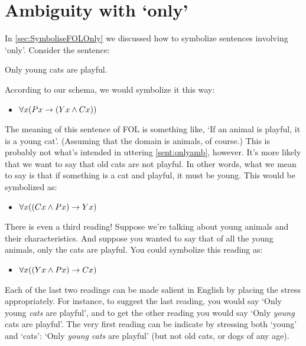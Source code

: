 			
			
			\section{Ambiguity with `only'}
			
			In \cref{sec:SymboliseFOLOnly} we discussed how to symbolize sentences involving `only'. Consider the sentence:
			\begin{samplesent}
				\item\label{sent:onlyamb} Only young cats are playful.
			\end{samplesent}
			According to our schema, we would symbolize it this way:
			\begin{itemize}
				\item $\forall x({P}{x} \rightarrow ({Y}{x} \mathbin{\wedge} {C}{x}))$
			\end{itemize}
			The meaning of this sentence of FOL is something like, `If an animal is playful, it is a young cat'. (Assuming that the domain is animals, of course.) This is probably not what's intended in uttering \cref{sent:onlyamb}, however. It's more likely that we want to say that old cats are not playful. In other words, what we mean to say is that if something is a cat and playful, it must be young. This would be symbolized as:
			\begin{itemize}
				\item $\forall x(({C}{x} \mathbin{\wedge} {P}{x}) \rightarrow {Y}{x})$
			\end{itemize}
			There is even a third reading! Suppose we're talking about young animals and their characteristics. And suppose you wanted to say that of all the young animals, only the cats are playful. You could symbolize this reading as:
			\begin{itemize}
				\item $\forall x(({Y}{x} \mathbin{\wedge} {P}{x}) \rightarrow {C}{x})$
			\end{itemize}
			Each of the last two readings can be made salient in English by placing the stress appropriately. For instance, to suggest the last reading, you would say `Only young \emph{cats} are playful', and to get the other reading you would say `Only \emph{young} cats are playful'.  The very first reading can be indicate by stressing both `young' and `cats': `Only \emph{young cats} are playful' (but not old cats, or dogs of any age).
			
